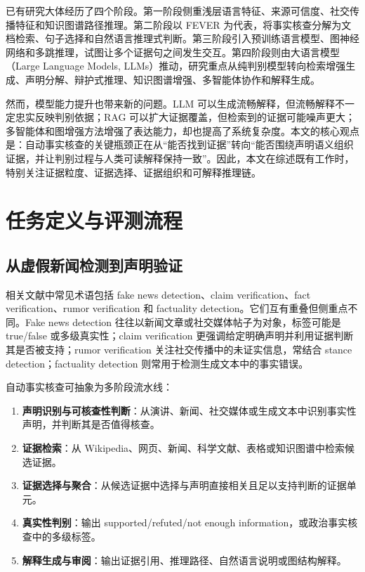 \documentclass[UTF8,a4paper,zihao=5,twocolumn]{ctexart}
\begin{document}
已有研究大体经历了四个阶段。第一阶段侧重浅层语言特征、来源可信度、社交传播特征和知识图谱路径推理。第二阶段以 FEVER 为代表，将事实核查分解为文档检索、句子选择和自然语言推理式判断。第三阶段引入预训练语言模型、图神经网络和多跳推理，试图让多个证据句之间发生交互。第四阶段则由大语言模型（Large Language Models, LLMs）推动，研究重点从纯判别模型转向检索增强生成、声明分解、辩护式推理、知识图谱增强、多智能体协作和解释生成。

然而，模型能力提升也带来新的问题。LLM 可以生成流畅解释，但流畅解释不一定忠实反映判别依据；RAG 可以扩大证据覆盖，但检索到的证据可能噪声更大；多智能体和图增强方法增强了表达能力，却也提高了系统复杂度。本文的核心观点是：自动事实核查的关键瓶颈正在从“能否找到证据”转向“能否围绕声明语义组织证据，并让判别过程与人类可读解释保持一致”。因此，本文在综述既有工作时，特别关注证据粒度、证据选择、证据组织和可解释推理链。

\section{任务定义与评测流程}

\subsection{从虚假新闻检测到声明验证}

相关文献中常见术语包括 fake news detection、claim verification、fact verification、rumor verification 和 factuality detection。它们互有重叠但侧重点不同。Fake news detection 往往以新闻文章或社交媒体帖子为对象，标签可能是 true/false 或多级真实性；claim verification 更强调给定明确声明并利用证据判断其是否被支持；rumor verification 关注社交传播中的未证实信息，常结合 stance detection；factuality detection 则常用于检测生成文本中的事实错误。

自动事实核查可抽象为多阶段流水线：
\begin{enumerate}
  \item \textbf{声明识别与可核查性判断}：从演讲、新闻、社交媒体或生成文本中识别事实性声明，并判断其是否值得核查。
  \item \textbf{证据检索}：从 Wikipedia、网页、新闻、科学文献、表格或知识图谱中检索候选证据。
  \item \textbf{证据选择与聚合}：从候选证据中选择与声明直接相关且足以支持判断的证据单元。
  \item \textbf{真实性判别}：输出 supported/refuted/not enough information，或政治事实核查中的多级标签。
  \item \textbf{解释生成与审阅}：输出证据引用、推理路径、自然语言说明或图结构解释。
\end{enumerate}
\end{document}
